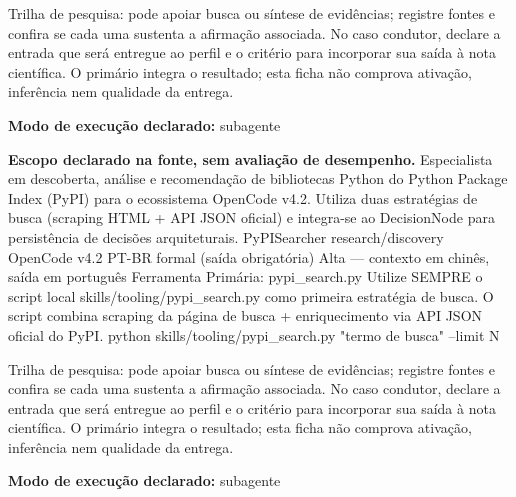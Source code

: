 \begin{funcao}
Trilha de pesquisa: pode apoiar busca ou síntese de evidências; registre fontes e confira se cada uma sustenta a afirmação associada. No caso condutor, declare a entrada que será entregue ao perfil e o critério para incorporar sua saída à nota científica. O primário integra o resultado; esta ficha não comprova ativação, inferência nem qualidade da entrega.
\end{funcao}

\begin{arquitetura}
\textbf{Modo de execução declarado:} subagente
\end{arquitetura}


\begin{descricao}
\textbf{Escopo declarado na fonte, sem avaliação de desempenho.}
Especialista em descoberta, análise e recomendação de bibliotecas Python do Python Package Index (PyPI) para o ecossistema OpenCode v4.2. Utiliza duas estratégias de busca (scraping HTML + API JSON oficial) e integra-se ao DecisionNode para persistência de decisões arquiteturais. PyPISearcher research/discovery OpenCode v4.2 PT-BR formal (saída obrigatória) Alta — contexto em chinês, saída em português Ferramenta Primária: pypi\_search.py Utilize SEMPRE o script local skills/tooling/pypi\_search.py como primeira estratégia de busca. O script combina scraping da página de busca + enriquecimento via API JSON oficial do PyPI. python skills/tooling/pypi\_search.py "termo de busca" --limit N
\end{descricao}

\begin{funcao}
Trilha de pesquisa: pode apoiar busca ou síntese de evidências; registre fontes e confira se cada uma sustenta a afirmação associada. No caso condutor, declare a entrada que será entregue ao perfil e o critério para incorporar sua saída à nota científica. O primário integra o resultado; esta ficha não comprova ativação, inferência nem qualidade da entrega.
\end{funcao}

\begin{arquitetura}
\textbf{Modo de execução declarado:} subagente
\end{arquitetura}


